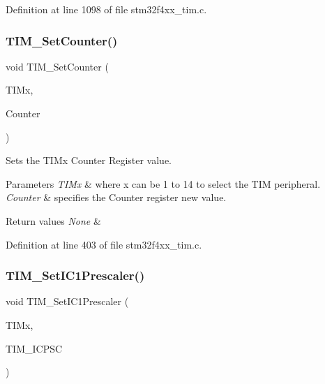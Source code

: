 Definition at line 1098 of file stm32f4xx\+\_\+tim.\+c.

\mbox{\label{group___t_i_m_ga18173e7955a85d5c2598c643eada2692}} 
\subsubsection{\texorpdfstring{T\+I\+M\+\_\+\+Set\+Counter()}{TIM\_SetCounter()}}
{\footnotesize\ttfamily void T\+I\+M\+\_\+\+Set\+Counter (\begin{DoxyParamCaption}\item[{\hyperlink{struct_t_i_m___type_def}{T\+I\+M\+\_\+\+Type\+Def} $\ast$}]{T\+I\+Mx,  }\item[{uint32\+\_\+t}]{Counter }\end{DoxyParamCaption})}



Sets the T\+I\+Mx Counter Register value. 


\begin{DoxyParams}{Parameters}
{\em T\+I\+Mx} & where x can be 1 to 14 to select the T\+IM peripheral. \\
\hline
{\em Counter} & specifies the Counter register new value. \\
\hline
\end{DoxyParams}

\begin{DoxyRetVals}{Return values}
{\em None} & \\
\hline
\end{DoxyRetVals}


Definition at line 403 of file stm32f4xx\+\_\+tim.\+c.

\mbox{\label{group___t_i_m_gaf0f684dea88e222de9689d8ed0ca8805}} 
\subsubsection{\texorpdfstring{T\+I\+M\+\_\+\+Set\+I\+C1\+Prescaler()}{TIM\_SetIC1Prescaler()}}
{\footnotesize\ttfamily void T\+I\+M\+\_\+\+Set\+I\+C1\+Prescaler (\begin{DoxyParamCaption}\item[{\hyperlink{struct_t_i_m___type_def}{T\+I\+M\+\_\+\+Type\+Def} $\ast$}]{T\+I\+Mx,  }\item[{uint16\+\_\+t}]{T\+I\+M\+\_\+\+I\+C\+P\+SC }\end{DoxyParamCaption})}



